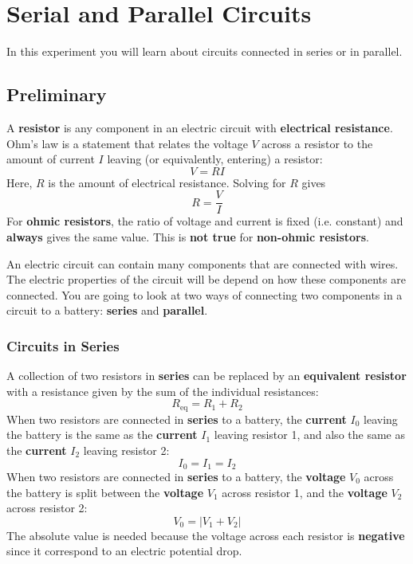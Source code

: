 \setcounter{chapter}{2}
\chapter{Serial and Parallel Circuits}
%
In this experiment you will learn about circuits connected in series or in parallel.
%
\section{Preliminary}
%
A \textbf{resistor} is any component in an electric circuit with \textbf{electrical resistance}. Ohm's law is a statement that relates the voltage $V$ across a resistor to the amount of current $I$ leaving (or equivalently, entering) a resistor:
\begin{equation}
	V = R I
\end{equation}
Here, $R$ is the amount of electrical resistance. Solving for $R$ gives
\begin{equation} \label{eq.03.ROhmLaw}
	R = \frac{V}{I}
\end{equation}
For \textbf{ohmic resistors}, the ratio of voltage and current is fixed (i.e. constant) and \textbf{always} gives the same value. This is \textbf{not true} for \textbf{non-ohmic resistors}.

An electric circuit can contain many components that are connected with wires. The electric properties of the circuit will be depend on how these components are connected. You are going to look at two ways of connecting two components in a circuit to a battery: \textbf{series} and \textbf{parallel}.
%
\subsection{Circuits in Series}
%
A collection of two resistors in \textbf{series} can be replaced by an \textbf{equivalent resistor} with a resistance given by the sum of the individual resistances:
\begin{equation} \label{eq.03.RSeries}
	R_{\text{eq}} = R_{1} + R_{2}
\end{equation}
When two resistors are connected in \textbf{series} to a battery, the \textbf{current} $I_{0}$ leaving the battery is the same as the \textbf{current} $I_{1}$ leaving resistor 1, and also the same as the \textbf{current} $I_{2}$ leaving resistor 2:
\begin{equation} \label{eq.03.ISeries}
	I_{0} = I_{1} = I_{2}
\end{equation}
When two resistors are connected in \textbf{series} to a battery, the \textbf{voltage} $V_{0}$ across the battery is split between the \textbf{voltage} $V_{1}$ across resistor 1, and the \textbf{voltage} $V_{2}$ across resistor 2:
\begin{equation} \label{eq.03.VSeries}
	V_{0} = \left| V_{1} + V_{2} \right|
\end{equation}
The absolute value is needed because the voltage across each resistor is \textbf{negative} since it correspond to an electric potential drop.
%
